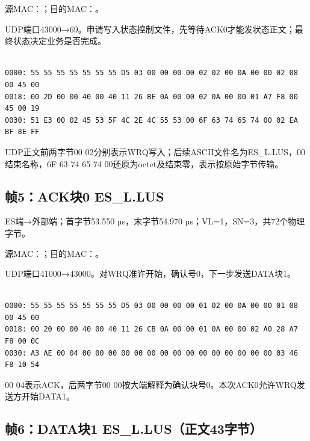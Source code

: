 源MAC：；目的MAC：。

UDP端口43000→69。申请写入状态控制文件，先等待ACK0才能发状态正文；最终状态决定业务是否完成。

\par\noindent\begin{minipage}{\linewidth}
\begin{lstlisting}[caption={帧4物理字节，偏移0000--0047}]

0000: 55 55 55 55 55 55 55 D5 03 00 00 00 00 02 02 00 0A 00 00 02 08 00 45 00
0018: 00 2D 00 00 40 00 40 11 26 BE 0A 00 00 02 0A 00 00 01 A7 F8 00 45 00 19
0030: 51 E3 00 02 45 53 5F 4C 2E 4C 55 53 00 6F 63 74 65 74 00 02 EA BF 8E FF

\end{lstlisting}
\end{minipage}\par

UDP正文前两字节00 02分别表示WRQ写入；后续ASCII文件名为ES\_L.LUS，00结束名称，6F 63 74 65 74 00还原为octet及结束零，表示按原始字节传输。

\subsection*{帧5：ACK块0 ES\_L.LUS}

ES端→外部端；首字节53.550 µs，末字节54.970 µs；VL=1，SN=3，共72个物理字节。

源MAC：；目的MAC：。

UDP端口41000→43000。对WRQ准许开始，确认号0，下一步发送DATA块1。

\par\noindent\begin{minipage}{\linewidth}
\begin{lstlisting}[caption={帧5物理字节，偏移0000--0047}]

0000: 55 55 55 55 55 55 55 D5 03 00 00 00 00 01 02 00 0A 00 00 01 08 00 45 00
0018: 00 20 00 00 40 00 40 11 26 CB 0A 00 00 01 0A 00 00 02 A0 28 A7 F8 00 0C
0030: A3 AE 00 04 00 00 00 00 00 00 00 00 00 00 00 00 00 00 00 03 46 F8 10 54

\end{lstlisting}
\end{minipage}\par

00 04表示ACK，后两字节00 00按大端解释为确认块号0。本次ACK0允许WRQ发送方开始DATA1。

\subsection*{帧6：DATA块1 ES\_L.LUS（正文43字节）}

